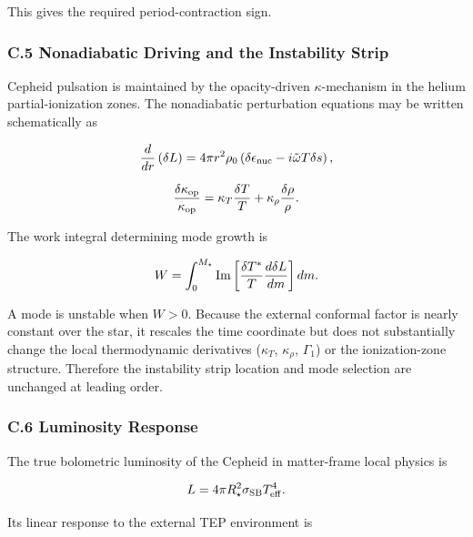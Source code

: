 \documentclass[
]{article}
\begin{document}
This gives the required period-contraction sign.

\subsubsection{C.5 Nonadiabatic Driving and the Instability
Strip}\label{c.5-nonadiabatic-driving-and-the-instability-strip}

Cepheid pulsation is maintained by the opacity-driven
\(\kappa\)-mechanism in the helium partial-ionization zones. The
nonadiabatic perturbation equations may be written schematically as

\begin{equation}
\frac{d}{dr}\left(\delta L\right) = 4\pi r^2\rho_0\left(\delta\epsilon_{\rm nuc} - i\tilde\omega T\delta s\right) ,
\end{equation}

\begin{equation}
\frac{\delta\kappa_{\rm op}}{\kappa_{\rm op}} = \kappa_T\frac{\delta T}{T} + \kappa_\rho\frac{\delta\rho}{\rho} .
\end{equation}

The work integral determining mode growth is

\begin{equation}
W = \int_0^{M_\star} {\rm Im}\left[\frac{\delta T^\ast}{T}\frac{d\delta L}{dm}\right]dm .
\end{equation}

A mode is unstable when \(W > 0\). Because the external conformal factor
is nearly constant over the star, it rescales the time coordinate but
does not substantially change the local thermodynamic derivatives
(\(\kappa_T\), \(\kappa_\rho\), \(\Gamma_1\)) or the ionization-zone
structure. Therefore the instability strip location and mode selection
are unchanged at leading order.

\subsubsection{C.6 Luminosity Response}\label{c.6-luminosity-response}

The true bolometric luminosity of the Cepheid in matter-frame local
physics is

\begin{equation}
L = 4\pi R_\star^2\sigma_{\rm SB}T_{\rm eff}^4 .
\end{equation}

Its linear response to the external TEP environment is
\end{document}
